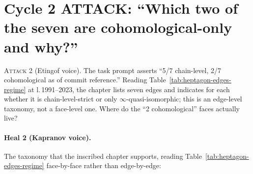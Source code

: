 \section{Cycle 2 ATTACK: ``Which two of the seven are cohomological-only and why?''}

\textsc{Attack 2} (Etingof voice). The task prompt asserts ``5/7 chain-level, 2/7 cohomological as of commit reference.'' Reading Table~\ref*{tab:heptagon-edges-regime} at l.\,1991--2023, the chapter lists seven edges and indicates for each whether it is chain-level-strict or only $\infty$-quasi-isomorphic; this is an edge-level taxonomy, not a face-level one. Where do the ``2 cohomological'' faces actually live?

\paragraph{Heal 2 (Kapranov voice).} The taxonomy that the inscribed chapter supports, reading Table~\ref*{tab:heptagon-edges-regime} face-by-face rather than edge-by-edge:

